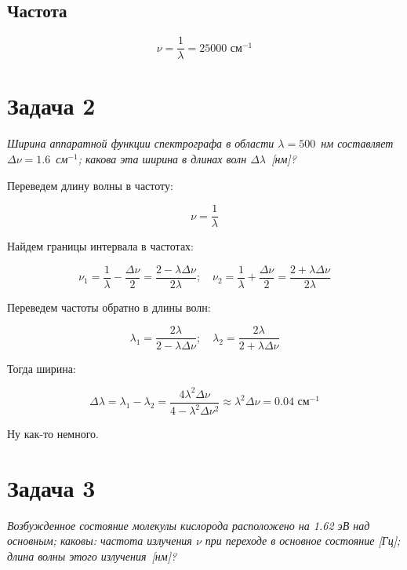 \documentclass[a4paper, 12pt]{article}
\begin{document}
\subsection{Частота}

\begin{equation}
	\nu = \frac{1}{\lambda} = 25000 \text{ см$^{-1}$}
\end{equation}

\section{Задача 2}

\textit{Ширина аппаратной функции спектрографа в области $\lambda = 500$~нм составляет \mbox{$\Delta \nu = 1.6$~см$^{-1}$}; какова эта ширина в длинах волн $\Delta \lambda$~[нм]?}

Переведем длину волны в частоту:

\begin{equation}
	\nu = \frac{1}{\lambda}
\end{equation}

Найдем границы интервала в частотах:

\begin{equation}
	\nu_1 = \frac{1}{\lambda} - \frac{\Delta \nu}{2} = \frac{2 - \lambda \Delta \nu}{2 \lambda}; \quad \nu_2 = \frac{1}{\lambda} + \frac{\Delta \nu}{2} = \frac{2 + \lambda \Delta \nu}{2 \lambda}
\end{equation}

Переведем частоты обратно в длины волн:

\begin{equation}
	\lambda_1 = \frac{2 \lambda}{2 - \lambda \Delta\nu}; \quad \lambda_2 = \frac{2 \lambda}{2 + \lambda \Delta\nu}
\end{equation}

Тогда ширина:

\begin{equation}
	\Delta \lambda = \lambda_1 - \lambda_2 = \frac{4\lambda^2 \Delta\nu}{4 - \lambda^2 \Delta\nu^2} \approx \lambda^2 \Delta \nu = 0.04 \text{ см$^{-1}$}
\end{equation}

Ну как-то немного.

\section{Задача 3}

\textit{Возбужденное состояние молекулы кислорода расположено на 1.62 эВ над основным; каковы: частота излучения $\nu$ при переходе в основное состояние [Гц]; длина волны этого излучения~[нм]?}
\end{document}
